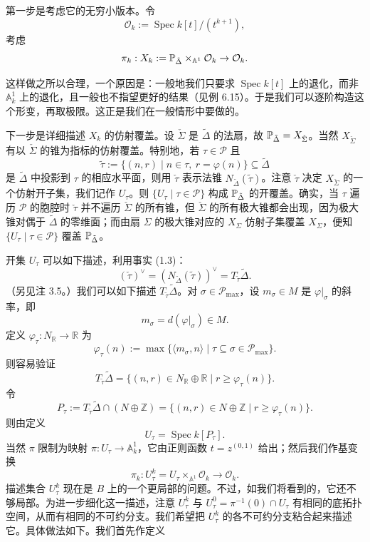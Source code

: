 第一步是考虑它的无穷小版本。令
\[
  \mathcal{O}_k:=\operatorname{Spec} k[t]/(t^{k+1}),
\]
考虑
\[
  \pi_k:X_k:=\mathbb{P}_{\tilde\Delta}\times_{\mathbb{A}^1}\mathcal{O}_k\to\mathcal{O}_k.
\]

这样做之所以合理，一个原因是：一般地我们只要求 $\operatorname{Spec} k[t]$ 上的退化，而非 $\mathbb{A}^1_k$ 上的退化，且一般也不指望更好的结果（见例 6.15）。于是我们可以逐阶构造这个形变，再取极限。这正是我们在一般情形中要做的。

下一步是详细描述 $X_k$ 的仿射覆盖。设 $\check\Sigma$ 是 $\tilde\Delta$ 的法扇，故 $\mathbb{P}_{\tilde\Delta}=X_{\check\Sigma}$。当然 $X_{\check\Sigma}$ 有以 $\check\Sigma$ 的锥为指标的仿射覆盖。特别地，若 $\tau\in\mathcal{P}$ 且
\[
  \tilde\tau:=\{(n,r)\mid n\in\tau,\ r=\varphi(n)\}\subseteq\tilde\Delta
\]
是 $\tilde\Delta$ 中投影到 $\tau$ 的相应水平面，则用 $\check\tau$ 表示法锥 $N_{\tilde\Delta}(\tilde\tau)$。注意 $\check\tau$ 决定 $X_{\check\Sigma}$ 的一个仿射开子集，我们记作 $U_\tau$。则 $\{U_\tau\mid\tau\in\mathcal{P}\}$ 构成 $\mathbb{P}_{\tilde\Delta}$ 的开覆盖。确实，当 $\tau$ 遍历 $\mathcal{P}$ 的胞腔时 $\check\tau$ 并不遍历 $\check\Sigma$ 的所有锥，但 $\check\Sigma$ 的所有极大锥都会出现，因为极大锥对偶于 $\tilde\Delta$ 的零维面；而由扇 $\Sigma$ 的极大锥对应的 $X_\Sigma$ 仿射子集覆盖 $X_\Sigma$，便知 $\{U_\tau\mid\tau\in\mathcal{P}\}$ 覆盖 $\mathbb{P}_{\tilde\Delta}$。

开集 $U_\tau$ 可以如下描述，利用事实 (1.3)：
\[
  (\check\tau)^{\vee}=(N_{\tilde\Delta}(\tilde\tau))^{\vee}=T_{\tilde\tau}\tilde\Delta.
\]
（另见注 3.5。）我们可以如下描述 $T_{\tilde\tau}\tilde\Delta$。对 $\sigma\in\mathcal{P}_{\max}$，设 $m_\sigma\in M$ 是 $\varphi|_\sigma$ 的斜率，即
\[
  m_\sigma=d(\varphi|_\sigma)\in M.
\]
定义 $\varphi_\tau:N_{\mathbb{R}}\to\mathbb{R}$ 为
\[
  \varphi_\tau(n):=\max\{\langle m_\sigma,n\rangle\mid\tau\subseteq\sigma\in\mathcal{P}_{\max}\}.
\]
则容易验证
\[
  T_{\tilde\tau}\tilde\Delta=\{(n,r)\in N_{\mathbb{R}}\oplus\mathbb{R}\mid r\ge\varphi_\tau(n)\}.
\]
令
\[
  P_\tau:=T_{\tilde\tau}\tilde\Delta\cap(N\oplus\mathbb{Z})
  =\{(n,r)\in N\oplus\mathbb{Z}\mid r\ge\varphi_\tau(n)\}.
\]
则由定义
\[
  U_\tau=\operatorname{Spec} k[P_\tau].
\]
当然 $\pi$ 限制为映射 $\pi:U_\tau\to\mathbb{A}^1_k$，它由正则函数 $t=z^{(0,1)}$ 给出；然后我们作基变换
\[
  \pi_k:U_\tau^k=U_\tau\times_{\mathbb{A}^1}\mathcal{O}_k\to\mathcal{O}_k.
\]
描述集合 $U_\tau^k$ 现在是 $B$ 上的一个更局部的问题。不过，如我们将看到的，它还不够局部。为进一步细化这一描述，注意 $U_\tau^k$ 与 $U_\tau^0=\pi^{-1}(0)\cap U_\tau$ 有相同的底拓扑空间，从而有相同的不可约分支。我们希望把 $U_\tau^k$ 的各不可约分支粘合起来描述它。具体做法如下。我们首先作定义

